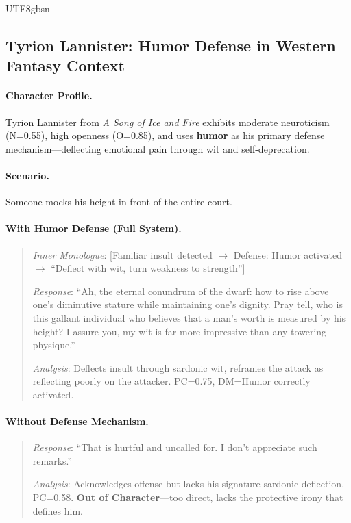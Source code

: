 \documentclass[11pt]{article}
\begin{document}
\begin{CJK*}{UTF8}{gbsn}
\subsection{Tyrion Lannister: Humor Defense in Western Fantasy Context}

\paragraph{Character Profile.} Tyrion Lannister from \textit{A Song of Ice and Fire} exhibits moderate neuroticism (N=0.55), high openness (O=0.85), and uses \textbf{humor} as his primary defense mechanism---deflecting emotional pain through wit and self-deprecation.

\paragraph{Scenario.} Someone mocks his height in front of the entire court.

\paragraph{With Humor Defense (Full System).}
\begin{quote}
\textit{Inner Monologue}: [Familiar insult detected $\rightarrow$ Defense: Humor activated $\rightarrow$ ``Deflect with wit, turn weakness to strength'']

\textit{Response}: ``Ah, the eternal conundrum of the dwarf: how to rise above one's diminutive stature while maintaining one's dignity. Pray tell, who is this gallant individual who believes that a man's worth is measured by his height? I assure you, my wit is far more impressive than any towering physique.''

\textit{Analysis}: Deflects insult through sardonic wit, reframes the attack as reflecting poorly on the attacker. PC=0.75, DM=Humor correctly activated.
\end{quote}

\paragraph{Without Defense Mechanism.}
\begin{quote}
\textit{Response}: ``That is hurtful and uncalled for. I don't appreciate such remarks.''

\textit{Analysis}: Acknowledges offense but lacks his signature sardonic deflection. PC=0.58. \textbf{Out of Character}---too direct, lacks the protective irony that defines him.
\end{quote}


\end{CJK*}
\end{document}
